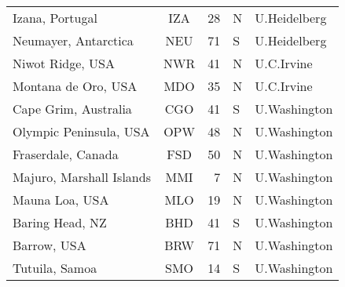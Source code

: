 \documentclass[grl]{agutexSI2019}
\begin{document}
\begin{table} [ht]
\begin{tabular}{lcr@{$^\circ$}ll}
Izana, Portugal				&	IZA		&	28	&	N						&	U.\@ Heidelberg		\\
Neumayer, Antarctica		&	NEU		&	71	&	S						&	U.\@ Heidelberg		\\
Niwot Ridge, USA			&	NWR		&	41	&	N						&	U.C.\@ Irvine		\\
Montana de Oro, USA			&	MDO		&	35	&	N						&	U.C.\@ Irvine		\\
Cape Grim, Australia		&	CGO		&	41	&	S						&	U.\@ Washington		\\
Olympic Peninsula, USA		&	OPW		&	48	&	N						&	U.\@ Washington		\\
Fraserdale, Canada			&	FSD		&	50	&	N						&	U.\@ Washington		\\
Majuro, Marshall Islands	&	MMI		&	7	&	N						&	U.\@ Washington		\\
Mauna Loa, USA				&	MLO		&	19	&	N						&	U.\@ Washington		\\
Baring Head, NZ				&	BHD		&	41	&	S						&	U.\@ Washington		\\
Barrow, USA					&	BRW		&	71	&	N						&	U.\@ Washington		\\
Tutuila, Samoa				&	SMO		&	14	&	S						&	U.\@ Washington		\\
\hline
\end{tabular}
\end{table}
\end{document}
